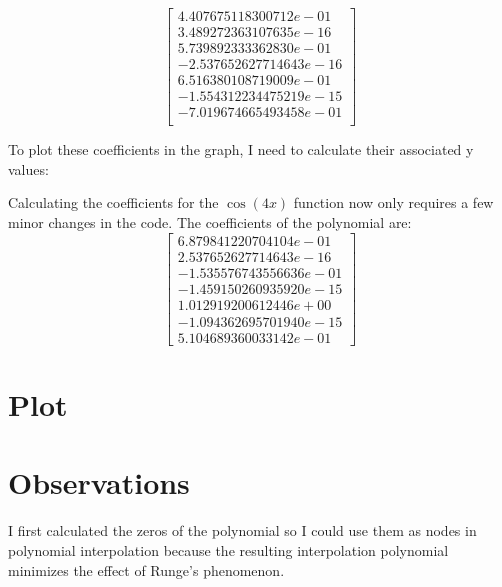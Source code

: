 \documentclass{article}
\begin{document}
$$
\begin{bmatrix} 
4.407675118300712e-01\\
3.489272363107635e-16\\
5.739892333362830e-01\\
-2.537652627714643e-16\\
6.516380108719009e-01\\
-1.554312234475219e-15\\
-7.019674665493458e-01\\
\end{bmatrix}
$$

To plot these coefficients in the graph, I need to calculate their associated y values:



Calculating the coefficients for the $\cos(4x)$ function now only requires a few minor changes in the code. The coefficients of the polynomial are:
$$
\begin{bmatrix} 
6.879841220704104e-01\\
2.537652627714643e-16\\
-1.535576743556636e-01\\
-1.459150260935920e-15\\
1.012919200612446e+00\\
-1.094362695701940e-15\\
5.104689360033142e-01\end{bmatrix}
$$


\section{Plot}
\section{Observations}
I first calculated the zeros of the polynomial so I could use them as nodes in polynomial interpolation because the resulting interpolation polynomial minimizes the effect of Runge's phenomenon.
\end{document}
